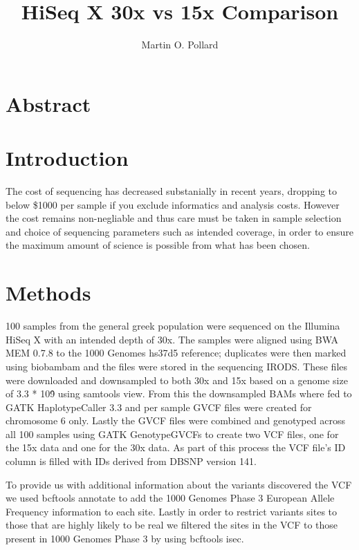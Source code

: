 \documentclass{article}
\title{HiSeq X 30x vs 15x Comparison}
\author{Martin O. Pollard}
\begin{document}
  \maketitle
  \newpage
  \tableofcontents
  \newpage
  \section{Abstract}

  \section{Introduction}

  The cost of sequencing has decreased substanially in recent years, dropping to
  below \$1000 per sample if you exclude informatics and analysis costs. However
  the cost remains non-negliable and thus care must be taken in sample
  selection and choice of sequencing parameters such as intended coverage, in
  order to ensure the maximum amount of science is possible from what has been
  chosen.

  \section{Methods}
  100 samples from the general greek population were sequenced on the Illumina
  HiSeq X with an intended depth of 30x. The samples were aligned using BWA MEM
  0.7.8 to the 1000 Genomes hs37d5 reference; duplicates were then marked using
  biobambam and the files were stored in the sequencing IRODS.  These files were
  downloaded and downsampled to both 30x and 15x based on a genome size of 3.3 *
  10\^9 using samtools view. From this the downsampled BAMs where fed to GATK
  HaplotypeCaller 3.3 and per sample GVCF files were created for chromosome 6
  only. Lastly the GVCF files were combined and genotyped across all 100 samples
  using GATK GenotypeGVCFs to create two VCF files, one for the 15x data and one
  for the 30x data. As part of this process the VCF file's ID column is filled
  with IDs derived from DBSNP version 141.

  To provide us with additional information about the variants discovered the
  VCF we used bcftools annotate to add the 1000 Genomes Phase 3 European Allele
  Frequency information to each site.  Lastly in order to restrict variants
  sites to those that are highly likely to be real we filtered the sites in the
  VCF to those present in 1000 Genomes Phase 3 by using bcftools isec.
\end{document}
